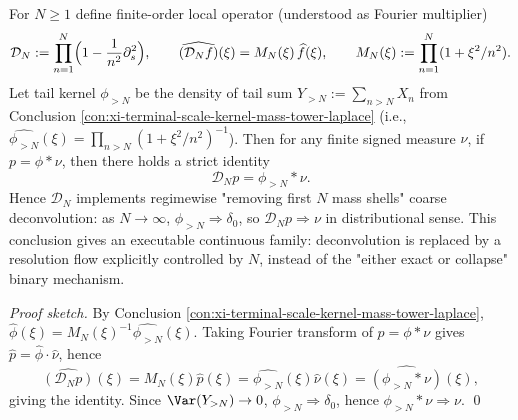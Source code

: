 \begin{conclusion}\label{con:xi-terminal-scale-kernel-partial-deconvolution-resolution}
For \(N\ge 1\) define finite-order local operator (understood as Fourier multiplier)
\[
\mathcal D_N:=\prod_{n=1}^{N}\Bigl(1-\frac{1}{n^2}\partial_s^2\Bigr),
\qquad
\widehat{(\mathcal D_N f)}(\xi)=M_N(\xi)\,\widehat f(\xi),
\qquad
M_N(\xi):=\prod_{n=1}^{N}(1+\xi^{2}/n^{2}).
\]
Let tail kernel \(\phi_{>N}\) be the density of tail sum
\(
Y_{>N}:=\sum_{n>N}X_n
\)
from Conclusion \ref{con:xi-terminal-scale-kernel-mass-tower-laplace} (i.e., \(\widehat{\phi_{>N}}(\xi)=\prod_{n>N}(1+\xi^{2}/n^{2})^{-1}\)).
Then for any finite signed measure \(\nu\), if \(p=\phi*\nu\), then there holds a strict identity
\[
\boxed{\;
\mathcal D_N p=\phi_{>N}*\nu.\;}
\]
Hence \(\mathcal D_N\) implements regimewise "removing first \(N\) mass shells" coarse deconvolution: as \(N\to\infty\), \(\phi_{>N}\Rightarrow\delta_0\), so \(\mathcal D_N p\Rightarrow \nu\) in distributional sense.
This conclusion gives an executable continuous family: deconvolution is replaced by a resolution flow explicitly controlled by \(N\), instead of the "either exact or collapse" binary mechanism.
\end{conclusion}
\begin{proof}[Proof sketch]
By Conclusion \ref{con:xi-terminal-scale-kernel-mass-tower-laplace}, \(\widehat\phi(\xi)=M_N(\xi)^{-1}\widehat{\phi_{>N}}(\xi)\).
Taking Fourier transform of \(p=\phi*\nu\) gives \(\widehat p=\widehat\phi\cdot\widehat\nu\), hence
\[
\widehat{(\mathcal D_N p)}(\xi)=M_N(\xi)\widehat p(\xi)=\widehat{\phi_{>N}}(\xi)\widehat\nu(\xi)=\widehat{(\phi_{>N}*\nu)}(\xi),
\]
giving the identity.
Since \(\Var(Y_{>N})\to 0\), \(\phi_{>N}\Rightarrow\delta_0\), hence \(\phi_{>N}*\nu\Rightarrow\nu\). \qed
\end{proof}

